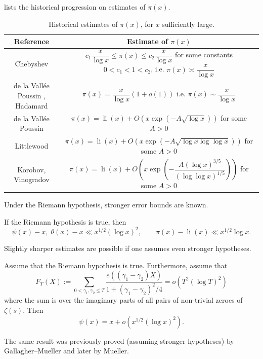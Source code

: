  lists the historical progression on estimates of $\pi(x)$.

\begin{table}[ht]
    \caption{Historical estimates of $\pi(x)$, for $x$ sufficiently large.}
    \label{prime-error-table}
    \centering
    \renewcommand{\arraystretch}{2.2}
    \begin{tabular}{|c|c|}
    \hline
    Reference & Estimate of $\pi(x)$\\
    \hline
    Chebyshev & $c_1 \dfrac{x}{\log x} \leq \pi(x) \leq c_2 \dfrac{x}{\log x}$ for some constants $0 < c_1 < 1 < c_2$, i.e. $\pi(x) \asymp \dfrac{x}{\log x}$\\
    \hline
    de la Vall\'{e}e Poussin \cite{de_la_vallee_poussin_recherches_1896}, Hadamard \cite{hadamard_distribution_1896} & $\pi(x) = \dfrac{x}{\log x}(1 + o(1))$ i.e. $\pi(x) \sim \dfrac{x}{\log x}$\\
    \hline
    de la Vall\'{e}e Poussin \cite{de_la_vallee_poussin_fonction_1899} & $\pi(x) = \operatorname{li}(x) + O(x\exp(-A\sqrt{\log x}))$ for some $A > 0$\\
    \hline
    Littlewood \cite{littlewood_researches_1922} & $\pi(x) = \operatorname{li}(x) + O(x\exp(-A\sqrt{\log x\log\log x}))$ for some $A > 0$\\
    \hline
    Korobov, Vinogradov \cite{vinogradov_eine_1958} & $\pi(x) = \operatorname{li}(x) + O\left(x\exp\left(-\dfrac{A(\log x)^{3/5}}{(\log\log x)^{1/5}}\right)\right)$ for some $A > 0$\\
    \hline
    \end{tabular}
\end{table}

Under the Riemann hypothesis, stronger error bounds are known.
\begin{theorem}
If the Riemann hypothesis is true, then
\[
\psi(x) - x,\; \theta(x) - x \ll x^{1/2}(\log x)^2,\qquad \pi(x) - \operatorname{li}(x) \ll x^{1/2}\log x.
\]
\end{theorem}

Slightly sharper estimates are possible if one assumes even stronger hypotheses.
\begin{theorem}
Assume that the Riemann hypothesis is true. Furthermore, assume that
\[
F_T(X) := \sum_{0 < \gamma_1, \gamma_2 \le T}\frac{e((\gamma_1 - \gamma_2)X)}{1 + (\gamma_1 - \gamma_2)^2/4} = o(T^2 (\log T)^2)
\]
where the sum is over the imaginary parts of all pairs of non-trivial zeroes of $\zeta(s)$. Then
\[
\psi(x) = x + o(x^{1/2}(\log x)^2).
\]
\end{theorem}
The same result was previously proved (assuming stronger hypotheses) by Gallagher--Mueller \cite{gallagher_primes_1978} and later by Mueller.

